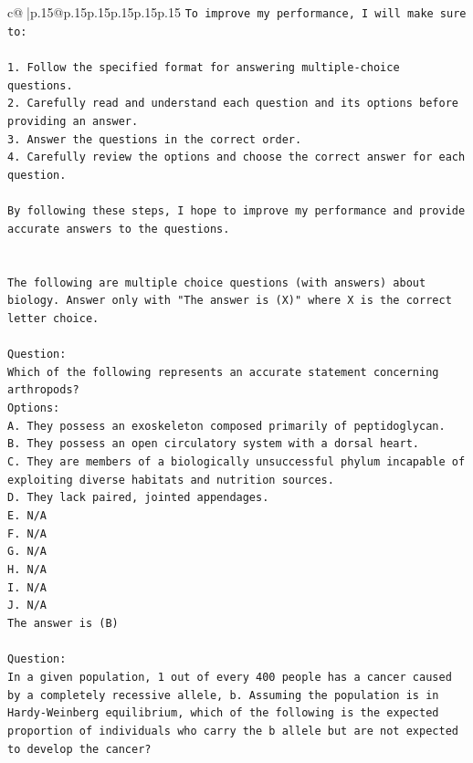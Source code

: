 \documentclass{article}
\begin{document}
{\begin{supertabular}{c@{$\;$}|p{.15\linewidth}@{}p{.15\linewidth}p{.15\linewidth}p{.15\linewidth}p{.15\linewidth}p{.15\linewidth}}
{{{\texttt{To improve my performance, I will make sure to:} \\
\\ 
\texttt{1. Follow the specified format for answering multiple{-}choice questions.} \\
\texttt{2. Carefully read and understand each question and its options before providing an answer.} \\
\texttt{3. Answer the questions in the correct order.} \\
\texttt{4. Carefully review the options and choose the correct answer for each question.} \\
\\ 
\texttt{By following these steps, I hope to improve my performance and provide accurate answers to the questions.} \\
\\ 
\\ 
\texttt{The following are multiple choice questions (with answers) about biology. Answer only with "The answer is (X)" where X is the correct letter choice.} \\
\\ 
\texttt{Question:} \\
\texttt{Which of the following represents an accurate statement concerning arthropods?} \\
\texttt{Options:} \\
\texttt{A. They possess an exoskeleton composed primarily of peptidoglycan.} \\
\texttt{B. They possess an open circulatory system with a dorsal heart.} \\
\texttt{C. They are members of a biologically unsuccessful phylum incapable of exploiting diverse habitats and nutrition sources.} \\
\texttt{D. They lack paired, jointed appendages.} \\
\texttt{E. N/A} \\
\texttt{F. N/A} \\
\texttt{G. N/A} \\
\texttt{H. N/A} \\
\texttt{I. N/A} \\
\texttt{J. N/A} \\
\texttt{The answer is (B)} \\
\\ 
\texttt{Question:} \\
\texttt{In a given population, 1 out of every 400 people has a cancer caused by a completely recessive allele, b. Assuming the population is in Hardy{-}Weinberg equilibrium, which of the following is the expected proportion of individuals who carry the b allele but are not expected to develop the cancer?} \\
}}}
\end{supertabular}}
\end{document}
